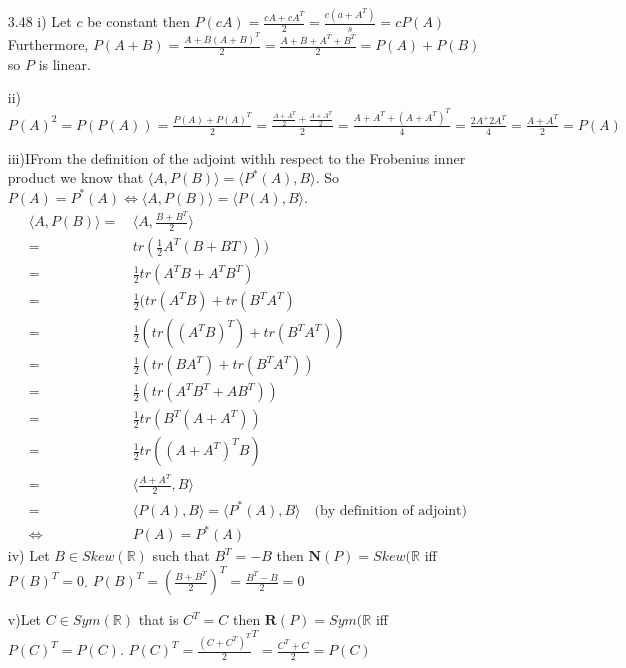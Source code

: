 \documentclass[letterpaper,12pt]{article}
\theoremstyle{definition}
\begin{document}
\begin{enumerate}
\item[3.48]
i) Let $c$ be constant then $P(cA) = \frac{cA + cA^T}{2} = \frac{c(a+A^T)}{s} = cP(A)$
Furthermore, $P(A+B) = \frac{A+B(A+B)^T}{2} = \frac{A+B+A^T+B^T}{2} = P(A) + P(B)$  so $P$ is linear.

ii)$P(A)^2  = P(P(A)) = \frac{P(A)+P(A)^T}{2} =\frac{\frac{A+A^T}{2}+\frac{A+A^T}{2}}{2}  = \frac{A+A^T + (A+A^T)^T}{4}= \frac{2A^+2A^T}{4} =\frac{A+A^T}{2} = P(A) $

iii)IFrom the definition of the adjoint withh respect to the Frobenius inner product we know that $\langle A, P(B) \rangle = \langle P^*(A), B \rangle $. So $P(A) = P^*(A) \iff \langle A, P(B) \rangle = \langle P(A), B \rangle$.
\begin{align*}
\langle A, P(B) \rangle  =&\, \langle A, \frac{B+B^T}{2} \rangle \\
=&\, tr(\frac{1}{2}A^T(B+BT)))\\
=&\, \frac{1}{2}tr(A^TB+A^TB^T) \\
= &\, \frac{1}{2} (tr(A^TB) +tr(B^TA^T
)\\
=&\, \frac{1}{2}(tr((A^TB)^T)+tr(B^TA^T))\\
=&\, \frac{1}{2}(tr(BA^T)+tr(B^TA^T))\\
=&\, \frac{1}{2}(tr(A^TB^T+AB^T))\\
=&\,\frac{1}{2} tr(B^T(A+A^T))\\
=&\, \frac{1}{2} tr((A+A^T)^TB)\\
=&\, \langle  \frac{A+A^T}{2},B \rangle\\
=&\, \langle P(A) , B \rangle =  \langle P^*(A), B \rangle \quad \text{(by definition of adjoint)}\\
\Leftrightarrow &\, P(A) = P^*(A)
\end{align*}
iv) Let $B \in Skew(\mathbb{R})$ such that $B^T=-B$ then $\mathbf{N}(P) = Skew(\mathbb{R}$ iff $P(B)^T=0$. $P(B)^T=(\frac{B+B^T}{2})^T=\frac{B^T-B}{2}=0$

v)Let $C \in Sym(\mathbb{R})$ that is $C^T=C$ then $\mathbf{R}(P) = Sym(\mathbb{R}$ iff $P(C)^T=P(C)$. $P(C)^T=\frac{(C+C^T)^T}{2}^T=\frac{C^T+C}{2}=P(C)$


\end{enumerate}
\end{document}
